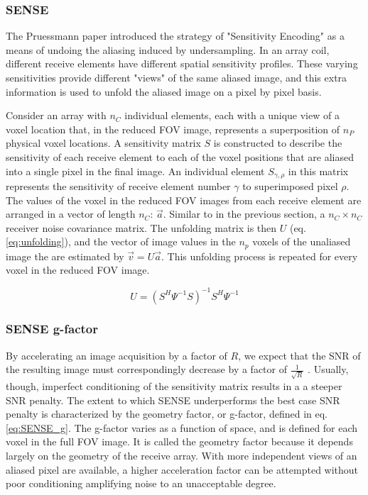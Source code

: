 \subsubsection{SENSE}
The Pruessmann paper \cite{Pruessmann1999} introduced the strategy of "Sensitivity Encoding" as a means of undoing the
aliasing induced by undersampling. In an array coil, different receive elements have different spatial sensitivity
profiles. These varying sensitivities provide different "views" of the same aliased image, and this extra information is
used to unfold the aliased image on a pixel by pixel basis.

Consider an array with $n_C$ individual elements, each with a unique view of a voxel location that, in the reduced FOV
image, represents a superposition of $n_P$ physical voxel locations. A sensitivity matrix $S$ is constructed to describe
the sensitivity of each receive element to each of the voxel positions that are aliased into a single pixel in the final
image. An individual element $S_{\gamma,\rho}$ in this matrix represents the sensitivity of receive element number
$\gamma$ to superimposed pixel $\rho$. The values of the voxel in the reduced FOV images from each receive element are
arranged in a vector of length $n_C$: $\vec{a}$. Similar to in the previous section, a $n_C \times n_C$ receiver noise covariance
matrix. The unfolding matrix is then $U$ (eq. \ref{eq:unfolding}), and the vector of image values in the $n_p$
voxels of the unaliased image the are estimated by $\vec{v} = U\vec{a}$. This unfolding process is repeated for every
voxel in the reduced FOV image.

\begin{equation}\label{eq:unfolding}
    U = (S^H\Psi^{-1}S)^{-1}S^H\Psi^{-1}
\end{equation}

\subsubsection{SENSE g-factor}
By accelerating an image acquisition by a factor of $R$, we expect that the SNR of the resulting image must
correspondingly decrease by a factor of $\frac{1}{\sqrt{R}}$ \cite{nishimura}. Usually, though, imperfect conditioning
of the sensitivity matrix results in a a steeper SNR penalty. The extent to which SENSE underperforms the best case SNR
penalty is characterized by the geometry factor, or g-factor, defined in eq. \ref{eq:SENSE_g}. The g-factor varies as a
function of space, and is defined for each voxel in the full FOV image. It is called the geometry factor because it
depends largely on the geometry of the receive array. With more independent views of an aliased pixel are available, a
higher acceleration factor can be attempted without poor conditioning amplifying noise to an unacceptable degree.

